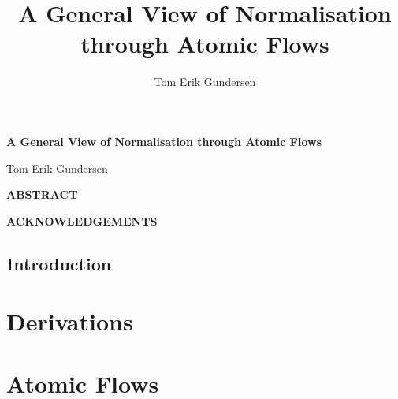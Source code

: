 \documentclass[a4paper,11pt]{report}
\author{Tom Erik Gundersen}
\title{A General View of Normalisation through Atomic Flows}
\begin{document}

%
%
%
\renewcommand{\thepage}{\roman{page}}
\maketitle

\clearpage
\thispagestyle{plain}
{\begin{center}
\vspace*{1.7cm}
{\def\baselinestretch{1.2}\Huge\bf A General View of Normalisation through Atomic Flows \par}
\vspace{4cm}
{\begin{center}{\huge Tom Erik Gundersen }\end{center}}
\end{center}}

\clearpage
\thispagestyle{plain}
\begin{center}
\vspace{20pt}
  \Large\bfseries{ABSTRACT}
\end{center}


\clearpage
\thispagestyle{plain}
\begin{center}
  {\Large\bfseries{ACKNOWLEDGEMENTS}}
\end{center}




{
\tableofcontents
}
\newpage
{}
\chapter{Introduction}

\part{Derivations}


\part{Atomic Flows}



\end{document}

